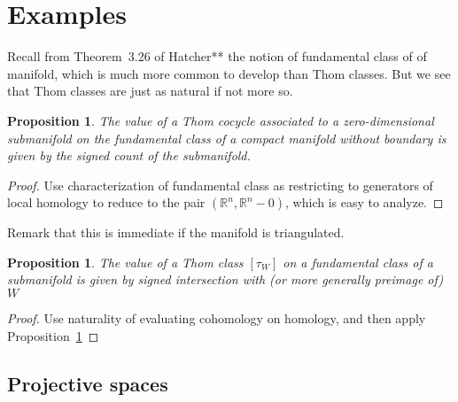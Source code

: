 \documentclass{amsart}          %
\newtheorem{proposition}[theorem]{Proposition}
\newcommand{\R}{\mathbb R}
\begin{document}
\section{Examples}

Recall from Theorem~3.26 of Hatcher** the notion of fundamental class of of manifold, which  is much more common to 
develop than Thom classes.  
But we see that Thom classes are just as natural if not more so.


\begin{proposition}\label{top_cohomology}
The value of a Thom cocycle associated to a zero-dimensional submanifold on the fundamental class of a compact manifold without
boundary  is given by 
the signed count of the submanifold.
\end{proposition}

\begin{proof}
Use characterization of fundamental class as restricting to generators of local homology to reduce to the pair $(\R^n, \R^n - 0)$,
which is easy to analyze.
\end{proof}

Remark that this is immediate if the manifold is triangulated.

\begin{proposition}
The value of a Thom class $[\tau_W]$ on  a fundamental class of a submanifold is given by signed intersection with 
(or more generally preimage of) $W$
\end{proposition}

\begin{proof}
Use naturality of evaluating cohomology on homology, and then apply Proposition~\ref{top_cohomology}
\end{proof}


\subsection{Projective spaces}
\end{document}
